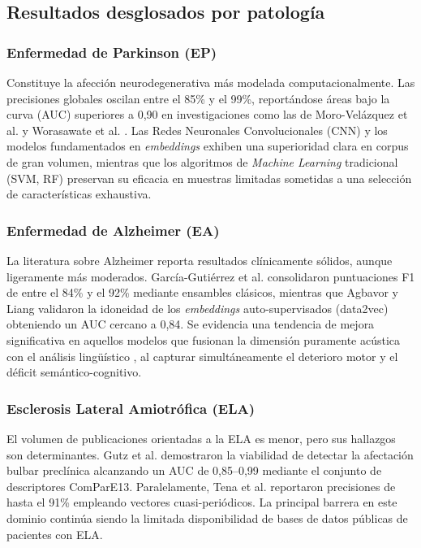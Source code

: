 \subsection{Resultados desglosados por patología}

\subsubsection*{Enfermedad de Parkinson (EP)}
Constituye la afección neurodegenerativa más modelada computacionalmente. Las precisiones globales oscilan entre el 85\% y el 99\%, reportándose áreas bajo la curva (AUC) superiores a 0,90 en investigaciones como las de Moro-Velázquez et al. \cite{moro2020, moro2021new} y Worasawate et al. \cite{worasawate2021}. Las Redes Neuronales Convolucionales (CNN) y los modelos fundamentados en \textit{embeddings} exhiben una superioridad clara en corpus de gran volumen, mientras que los algoritmos de \textit{Machine Learning} tradicional (SVM, RF) preservan su eficacia en muestras limitadas sometidas a una selección de características exhaustiva.

\subsubsection*{Enfermedad de Alzheimer (EA)}
La literatura sobre Alzheimer reporta resultados clínicamente sólidos, aunque ligeramente más moderados. García-Gutiérrez et al. \cite{garcia-gutierrezUnveilingSoundCognitive2024} consolidaron puntuaciones F1 de entre el 84\% y el 92\% mediante ensambles clásicos, mientras que Agbavor y Liang \cite{agbavor2022} validaron la idoneidad de los \textit{embeddings} auto-supervisados (data2vec) obteniendo un AUC cercano a 0,84. Se evidencia una tendencia de mejora significativa en aquellos modelos que fusionan la dimensión puramente acústica con el análisis lingüístico \cite{he2023}, al capturar simultáneamente el deterioro motor y el déficit semántico-cognitivo.

\subsubsection*{Esclerosis Lateral Amiotrófica (ELA)}
El volumen de publicaciones orientadas a la ELA es menor, pero sus hallazgos son determinantes. Gutz et al. \cite{gutz2019} demostraron la viabilidad de detectar la afectación bulbar preclínica alcanzando un AUC de 0,85–0,99 mediante el conjunto de descriptores ComParE13. Paralelamente, Tena et al. \cite{tenaALS} reportaron precisiones de hasta el 91\% empleando vectores cuasi-periódicos. La principal barrera en este dominio continúa siendo la limitada disponibilidad de bases de datos públicas de pacientes con ELA.

